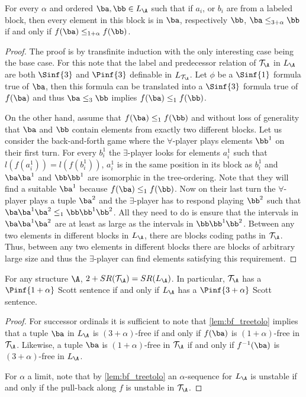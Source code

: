 \documentclass{amsart}
\newcommand{\T}{{\mathcal{T}}}
\newcommand{\SR}{SR}
\begin{document}
\begin{lemma}\label{lem:bf_treetolo}
   For every $\alpha$ and ordered $\ba,\bb\in L_\A$ such that if $a_i$, or $b_i$ are from a labeled
   block, then every element in this block is in $\ba$, respectively $\bb$, $\ba\leq_{3+\alpha}\bb$ if
   and only if $f(\ba)\leq_{1+\alpha} f(\bb)$.
\end{lemma}
\begin{proof}
   The proof is by transfinite induction with the only interesting case being
   the base case. For this note that the label and predecessor
   relation of $\T_\A$ in $L_{\A}$ are both $\Sinf{3}$ and $\Pinf{3}$
   definable in $L_{\T_\A}$. Let $\phi$ be a $\Sinf{1}$ formula true of
   $\ba$, then this formula can be translated into a $\Sinf{3}$ formula true
   of $f(\ba)$ and thus $\ba\leq_3 \bb$ implies $f(\ba)\leq_1 f(\bb)$. 

   On the other hand, assume that $f(\ba)\leq_1 f(\bb)$ and without loss of
   generality that $\ba$ and $\bb$ contain elements from exactly two
   different blocks. Let us consider the back-and-forth game where the
   $\forall$-player plays elements $\bb^1$ on their first turn. For every
   $b^1_i$ the $\exists$-player looks for elements $a^1_i$ such that
   $l(f(a^1_i))=l(f(b^1_i))$, $a^1_i$ is in the same position in its block as
   $b^1_i$ and $\ba\ba^1$ and $\bb\bb^1$ are
   isomorphic in the tree-ordering. Note that they will find a suitable $\ba^1$
   because $f(\ba)\leq_1 f(\bb)$. Now on their last turn the $\forall$-player
   plays a tuple $\ba^2$ and the $\exists$-player has to respond playing
   $\bb^2$ such that $\ba\ba^1\ba^2\leq_1 \bb\bb^1\bb^2$. All they need to do
   is ensure that the intervals in $\ba\ba^1\ba^2$ are at least as large as the
   intervals in $\bb\bb^1\bb^2$. Between any two elements in different blocks in
   $L_\A$, there are blocks coding paths in $\T_\A$. Thus, between any two
   elements in different blocks there are blocks of arbitrary large size and
   thus the $\exists$-player can find elements satisfying this requirement.
\end{proof}
\begin{lemma}
   For any structure $\A$, $2+\SR(\T_\A)=\SR(L_\A)$. In
   particular, $\T_\A$ has a $\Pinf{1+\alpha}$ Scott sentence if and only if
   $L_\A$ has a $\Pinf{3+\alpha}$ Scott sentence.
\end{lemma}
\begin{proof}
   For successor ordinals it is sufficient to note that \cref{lem:bf_treetolo} implies that a tuple $\ba$ in $L_\A$ is $(3+\alpha)$-free if and only if $f(\ba)$ is
   $(1+\alpha)$-free in $\T_\A$. Likewise, a tuple $\ba$ is
   $(1+\alpha)$-free in $\T_\A$ if and only if $f^{-1}(\ba)$ is
   $(3+\alpha)$-free in $L_\A$. 

   For $\alpha$ a limit, note that by \cref{lem:bf_treetolo} an
   $\alpha$-sequence for $L_\A$ is unstable if and only if the pull-back along
   $f$ is unstable in $\T_\A$.
\end{proof}
\end{document}
